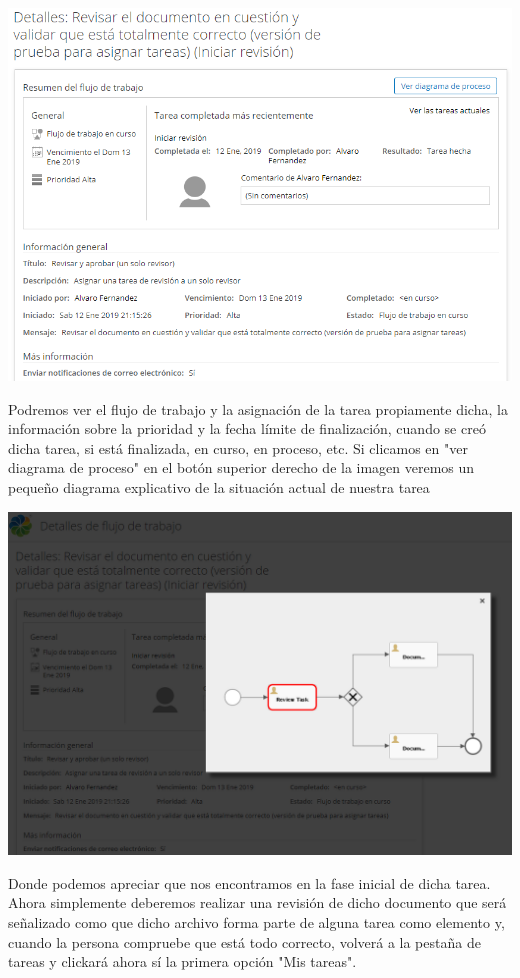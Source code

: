\documentclass{article}
\begin{document}
\begin{center}
\includegraphics[scale=0.6]{images/diagrama.png}
\end{center}

Podremos ver el flujo de trabajo y la asignación de la tarea propiamente dicha, la información sobre la prioridad y la fecha límite de finalización, cuando se creó dicha tarea, si está finalizada, en curso, en proceso, etc. Si clicamos en "ver diagrama de proceso" en el botón superior derecho de la imagen veremos un pequeño diagrama explicativo de la situación actual de nuestra tarea

\begin{center}
\includegraphics[scale=0.5]{images/flujo.png}
\end{center}

Donde podemos apreciar que nos encontramos en la fase inicial de dicha tarea. Ahora simplemente deberemos realizar una revisión de dicho documento que será señalizado como que dicho archivo forma parte de alguna tarea como elemento y, cuando la persona compruebe que está todo correcto, volverá a la pestaña de tareas y clickará ahora sí la primera opción "Mis tareas".
\end{document}
